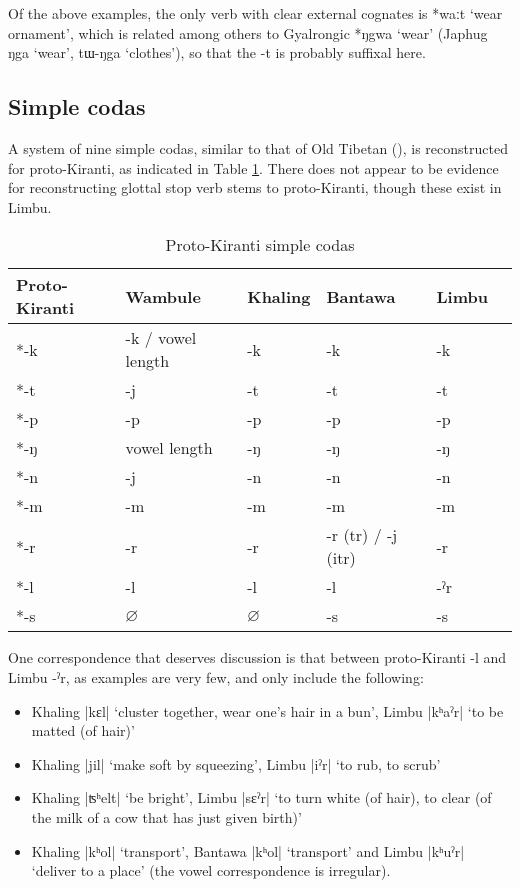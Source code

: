 \documentclass[oneside,a4paper,11pt]{article}
\newcommand{\ipa}[1]{{\phon\mbox{#1}}} %
\newcommand{\dhatu}[2]{|\ipa{#1}| `#2'}
\begin{document}
Of the above examples, the only verb with clear external cognates is \ipa{*waːt} `wear ornament', which is related among others to Gyalrongic *\ipa{ŋgwa} `wear' (Japhug \ipa{ŋga} `wear', \ipa{tɯ-ŋga} `clothes'), so that the \ipa{-t} is probably suffixal here. 

\subsection{Simple codas} \label{sec:codas}
A system of nine simple codas, similar to that of Old Tibetan (\citealt{hill10synchronic}), is reconstructed for proto-Kiranti, as indicated in Table \ref{tab:codas}. There does not appear to be evidence for reconstructing glottal stop verb stems to proto-Kiranti, though these exist in Limbu.

\begin{table}[H]
\caption{Proto-Kiranti simple codas} \centering \label{tab:codas}
\begin{tabular}{llllll}
\toprule
Proto-Kiranti & Wambule & Khaling & Bantawa & Limbu \\
\midrule
\ipa{*-k} & \ipa{-k} / vowel length& \ipa{-k} & \ipa{-k} & \ipa{-k}  \\
\ipa{*-t} & \ipa{-j} & \ipa{-t} & \ipa{-t} & \ipa{-t}  \\
\ipa{*-p} & \ipa{-p} & \ipa{-p} & \ipa{-p} & \ipa{-p}  \\
\midrule
\ipa{*-ŋ} & vowel length & \ipa{-ŋ} & \ipa{-ŋ} & \ipa{-ŋ}  \\
\ipa{*-n} & \ipa{-j}  & \ipa{-n} & \ipa{-n} & \ipa{-n}  \\
\ipa{*-m} & \ipa{-m} & \ipa{-m} & \ipa{-m} & \ipa{-m}  \\
\midrule
\ipa{*-r} &  \ipa{-r}  & \ipa{-r} & \ipa{-r} (tr) / \ipa{-j} (itr) & \ipa{-r}  \\
\ipa{*-l} & \ipa{-l}  & \ipa{-l} & \ipa{-l} & \ipa{-ˀr}  \\
\ipa{*-s} &$\varnothing$ & $\varnothing$ & \ipa{-s} & \ipa{-s}  \\
\bottomrule
\end{tabular}
\end{table}

One correspondence that deserves discussion is that between proto-Kiranti \ipa{-l} and Limbu \ipa{-ˀr}, as examples are very few, and only include the following:

\begin{itemize}
\item  Khaling \dhatu{kɛl}{cluster together, wear one's hair in a bun}, Limbu \dhatu{kʰaˀr}{to be matted (of hair)}  			 
\item  Khaling \dhatu{jil}{make soft by squeezing}, Limbu \dhatu{iˀr}{to rub, to scrub}  		 
\item   Khaling \dhatu{ʦʰelt}{be bright}, Limbu \dhatu{sɛˀr}{to turn white (of hair), to clear (of the milk of a cow that has just given birth)}  
\item Khaling \dhatu{kʰol}{transport}, Bantawa	  \dhatu{kʰol}{transport}	 and	 Limbu \dhatu{kʰuˀr}{deliver to a place}	  (the vowel correspondence is irregular).
\end{itemize}
\end{document}
